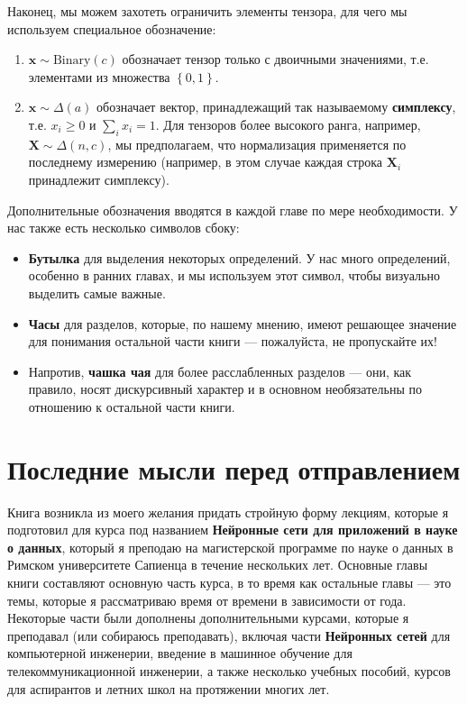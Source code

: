 %
Наконец, мы можем захотеть ограничить элементы тензора, для чего мы используем специальное обозначение:
%
\begin{enumerate}
    \item $\mathbf{x} \sim \text{Binary}(c)$ обозначает тензор только с двоичными значениями, т.е. элементами из множества $\left\{0,1\right\}$.
    \item $\mathbf{x} \sim \Delta(a)$ обозначает вектор, принадлежащий так называемому \textbf{симплексу}, т.е. $x_i \ge 0$ и $\sum_i x_i = 1$. Для тензоров более высокого ранга, например, $\mathbf{X} \sim \Delta(n,c)$, мы предполагаем, что нормализация применяется по последнему измерению (например, в этом случае каждая строка $\mathbf{X}_i$ принадлежит симплексу).
\end{enumerate}
%
Дополнительные обозначения вводятся в каждой главе по мере необходимости. У нас также есть несколько символов сбоку: 

\begin{itemize}
\item  \addbottle \textbf{Бутылка} для выделения некоторых определений. У нас много определений, особенно в ранних главах, и мы используем этот символ, чтобы визуально выделить самые важные.
\item \addclock \textbf{Часы} для разделов, которые, по нашему мнению, имеют решающее значение для понимания остальной части книги — пожалуйста, не пропускайте их!
\item \addteacup Напротив, \textbf{чашка чая} для более расслабленных разделов — они, как правило, носят дискурсивный характер и в основном необязательны по отношению к остальной части книги.
\end{itemize}

\section*{Последние мысли перед отправлением}

Книга возникла из моего желания придать стройную форму лекциям, которые я подготовил для курса под названием \textbf{Нейронные сети для приложений в науке о данных}, который я преподаю на магистерской программе по науке о данных в Римском университете Сапиенца в течение нескольких лет. Основные главы книги составляют основную часть курса, в то время как остальные главы — это темы, которые я рассматриваю время от времени в зависимости от года. Некоторые части были дополнены дополнительными курсами, которые я преподавал (или собираюсь преподавать), включая части \textbf{Нейронных сетей} для компьютерной инженерии, введение в машинное обучение для телекоммуникационной инженерии, а также несколько учебных пособий, курсов для аспирантов и летних школ на протяжении многих лет.

